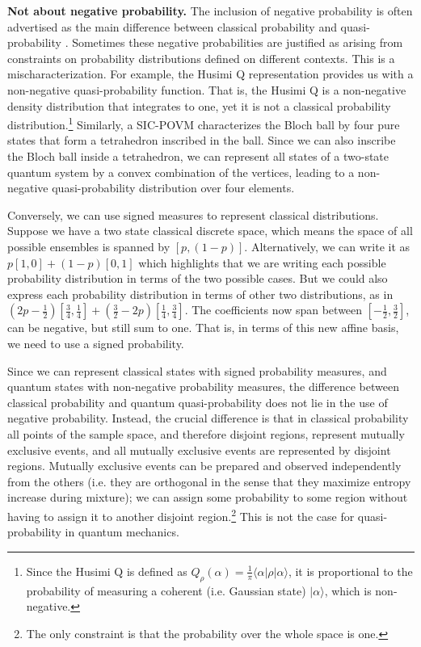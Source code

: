 \documentclass[10pt,twocolumn, nofootinbib]{revtex4-2}
\begin{document}
\textbf{Not about negative probability.} The inclusion of negative probability is often advertised as the main difference between classical probability and quasi-probability \cite{adhikary2020}. Sometimes these negative probabilities are justified as arising from constraints on probability distributions defined on different contexts. This is a mischaracterization. For example, the Husimi Q representation provides us with a non-negative quasi-probability function. That is, the Husimi Q is a non-negative density distribution that integrates to one, yet it is not a classical probability distribution.\footnote{Since the Husimi Q is defined as $Q_{\rho} ( \alpha ) = \frac{1}{\pi} \langle \alpha | \rho | \alpha \rangle$, it is proportional to the probability of measuring a coherent (i.e. Gaussian state) $| \alpha \rangle$, which is non-negative. } Similarly, a SIC-POVM characterizes the Bloch ball by four pure states that form a tetrahedron inscribed in the ball. Since we can also inscribe the Bloch ball inside a tetrahedron, we can represent all states of a two-state quantum system by a convex combination of the vertices, leading to a non-negative quasi-probability distribution over four elements.

Conversely, we can use signed measures to represent classical distributions. Suppose we have a two state classical discrete space, which means the space of all possible ensembles is spanned by $[p, (1-p)]$. Alternatively, we can write it as $p[1,0] + (1-p)[0,1]$ which highlights that we are writing each possible probability distribution in terms of the two possible cases. But we could also express each probability distribution in terms of other two distributions, as in $\left(2p - \frac{1}{2}\right)\left[\frac{3}{4}, \frac{1}{4}\right] + \left(\frac{3}{2} - 2p\right)\left[\frac{1}{4}, \frac{3}{4}\right]$. The coefficients now span between $\left[-\frac{1}{2}, \frac{3}{2}\right]$, can be negative, but still sum to one. That is, in terms of this new affine basis, we need to use a signed probability.

Since we can represent classical states with signed probability measures, and quantum states with non-negative probability measures, the difference between classical probability and quantum quasi-probability does not lie in the use of negative probability. Instead, the crucial difference is that in classical probability all points of the sample space, and therefore disjoint regions, represent mutually exclusive events, and all mutually exclusive events are represented by disjoint regions. Mutually exclusive events can be prepared and observed independently from the others (i.e. they are orthogonal in the sense that they maximize entropy increase during mixture); we can assign some probability to some region without having to assign it to another disjoint region.\footnote{The only constraint is that the probability over the whole space is one.} This is not the case for quasi-probability in quantum mechanics.
\end{document}
